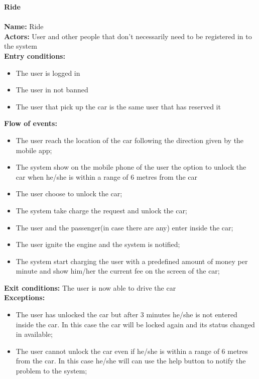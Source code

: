 \textbf{Ride}\\
\\
\textbf{Name:} Ride\\
\textbf{Actors:} User and other people that don't necessarily need to be registered in to the system\\
\textbf{Entry conditions:}
\begin{itemize}
\item The user is logged in
\item The user in not banned
\item The user that pick up the car is the same user that has reserved it
\end{itemize}
\textbf{Flow of events:}
\begin{itemize}
\item The user reach the location of the car following the direction given by the mobile app;
\item The system show on the mobile phone of the user the option to unlock the car when he/she is within a range of 6 metres from the car
\item The user choose to unlock the car;
\item The system take charge the request and unlock the car;
\item The user and the passenger(in case there are any) enter inside the car;
\item The user ignite the engine and the system is notified;
\item The system start charging the user with a predefined amount of money per minute and show him/her the current fee on the screen of the car;
\end{itemize}
\textbf{Exit conditions:} The user is now able to drive the car \\
\textbf{Exceptions:}
\begin{itemize}
\item The user has unlocked the car but after 3 minutes he/she is not entered inside the car. In this case  the car will be locked again and its status changed in available;
\item The user cannot unlock the car even if he/she is within a range of 6 metres from the car. In this case he/she will can use the help button  to notify the problem to the system;
\end{itemize}



